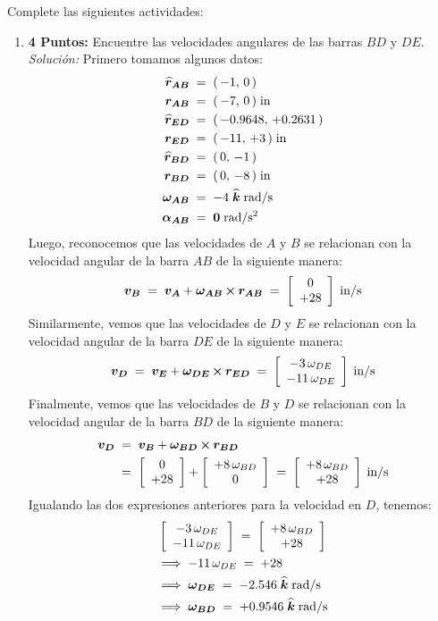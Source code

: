 \documentclass[ a4paper, twoside, 11pt]{article}
\begin{document}
\begin{problem}
Complete las siguientes actividades: 
\begin{enumerate}[label=\textbf{\alph*)}]
\item \textbf{4 Puntos:} Encuentre las velocidades angulares de las barras $BD$ y $DE$. \\[1ex]
\emph{Soluci\'on:} Primero tomamos algunos datos: 
\begin{align*}
{\boldsymbol{\widehat{r}_{AB}}} \; & = \; ( \, -1, \, 0 \, ) \\
{\boldsymbol{r_{AB}}} \; & = \; ( \, -7, \, 0 \, ) \; \text{in} \\
{\boldsymbol{\widehat{r}_{ED}}} \; & = \; ( \, -0.9648, \, +0.2631 \, ) \\
{\boldsymbol{r_{ED}}} \; & = \; ( \, -11, \, +3 \, ) \; \text{in} \\
{\boldsymbol{\widehat{r}_{BD}}} \; & = \; ( \, 0, \, -1 \, ) \\
{\boldsymbol{r_{BD}}} \; & = \; ( \, 0, \, -8 \, ) \; \text{in} \\
{\boldsymbol{\omega_{AB}}} \; & = \; -4 \; {\boldsymbol{\widehat{k}}} \; \text{rad/s} \\
{\boldsymbol{\alpha_{AB}}} \; & = \; {\boldsymbol{0}} \; \text{rad/s\ensuremath{^{\text{2}}}}
\end{align*}
Luego, reconocemos que las velocidades de $A$ y $B$ se relacionan con la velocidad angular de la barra $AB$ de la siguiente manera: 
\[
{\boldsymbol{v_B}}
\; = \; {\boldsymbol{v_A}} + {\boldsymbol{\omega_{AB}}} \,{\boldsymbol{\times}}\, {\boldsymbol{r_{AB}}}
\; = \; \left[ \begin{array}{c} 0 \\ +28 \end{array} \right] \; \text{in/s}
\]
Similarmente, vemos que las velocidades de $D$ y $E$ se relacionan con la velocidad angular de la barra $DE$ de la siguiente manera: 
\[
{\boldsymbol{v_D}}
\; = \; {\boldsymbol{v_E}} + {\boldsymbol{\omega_{DE}}} \,{\boldsymbol{\times}}\, {\boldsymbol{r_{ED}}}
\; = \; \left[ \begin{array}{c}  -3 \, \omega_{DE} \\  -11 \, \omega_{DE} \end{array} \right] \; \text{in/s}
\]
Finalmente, vemos que las velocidades de $B$ y $D$ se relacionan con la velocidad angular de la barra $BD$ de la siguiente manera: 
\begin{align*}
{\boldsymbol{v_D}} \;
& = \; {\boldsymbol{v_B}} + {\boldsymbol{\omega_{BD}}} \,{\boldsymbol{\times}}\, {\boldsymbol{r_{BD}}} \\
& = \; \left[ \begin{array}{c} 0 \\ +28 \end{array} \right] + \left[ \begin{array}{c}  +8 \, \omega_{BD} \\ 0 \end{array} \right]
\; = \; \left[ \begin{array}{c}  +8 \, \omega_{BD} \\  +28 \end{array} \right] \; \text{in/s}
\end{align*}
Igualando las dos expresiones anteriores para la velocidad en $D$, tenemos: 
\begin{align*}
&
\left[ \begin{array}{c}  -3 \, \omega_{DE} \\  -11 \, \omega_{DE} \end{array} \right]
\; = \; \left[ \begin{array}{c}  +8 \, \omega_{BD} \\  +28 \end{array} \right] \\
& \Longrightarrow \;
-11 \, \omega_{DE} \; = \; +28 \\
& \Longrightarrow \;
{\boldsymbol{\omega_{DE}}} \; = \; -2.546 \; {\boldsymbol{\widehat{k}}} \; \text{rad/s} \\
& \Longrightarrow \;
{\boldsymbol{\omega_{BD}}} \; = \; +0.9546 \; {\boldsymbol{\widehat{k}}} \; \text{rad/s}
\end{align*}


\end{enumerate}
\end{problem}
\end{document}
